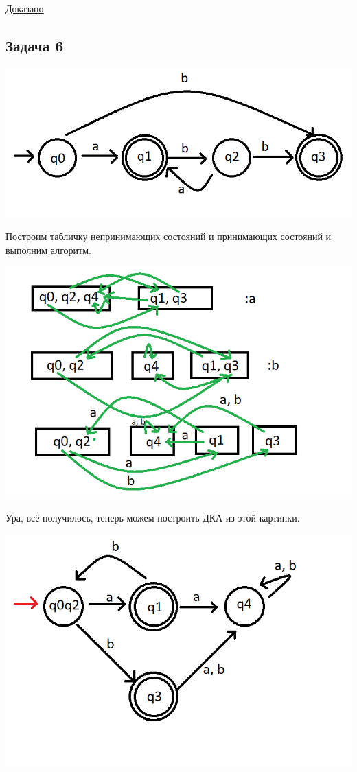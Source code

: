 \documentclass[a4paper,14pt]{article} %
\begin{document}
\underline{Доказано}

\subsection{Задача 6}

\includegraphics[scale=0.7]{05.png}

Построим табличку непринимающих состояний и принимающих состояний и выполним алгоритм.

\includegraphics[scale=0.7]{03.png}

Ура, всё получилось, теперь можем построить ДКА из этой картинки.

\includegraphics[scale=0.7]{04.png}
\end{document}
